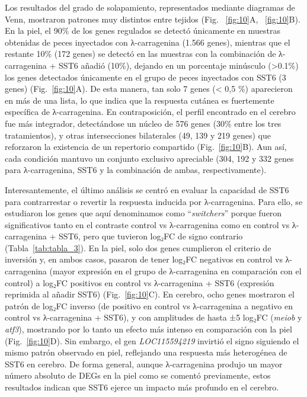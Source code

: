\documentclass[10pt,a4paper]{article}
\begin{document}
\newpage
Los resultados del grado de solapamiento, representados mediante diagramas de Venn, mostraron patrones muy distintos entre tejidos (Fig. ~\ref{fig:10}A, ~\ref{fig:10}B). En la piel, el 90\% de los genes regulados se detectó únicamente en muestras obtenidas de peces inyectados con λ-carragenina (1.566 genes), mientras que el restante 10\% (172 genes) se detectó en las muestras con la combinación de λ-carragenina + SST6 añadió (10\%), dejando en un porcentaje minúsculo (>0.1\%) los genes detectados únicamente en el grupo de peces inyectados con SST6 (3 genes) (Fig.~\ref{fig:10}A). De esta manera, tan solo 7 genes (< 0,5 \%) aparecieron en más de una lista, lo que indica que la respuesta cutánea es fuertemente específica de λ-carragenina. En contraposición, el perfil encontrado en el cerebro fue más integrador, detectándose un núcleo de 576 genes (30\% entre los tres tratamientos), y otras intersecciones bilaterales (49, 139 y 219 genes) que reforzaron la existencia de un repertorio compartido (Fig.~\ref{fig:10}B). Aun así, cada condición mantuvo un conjunto exclusivo apreciable (304, 192 y 332 genes para λ-carragenina, SST6 y la combinación de ambas, respectivamente).

Interesantemente, el último análisis se centró en evaluar la capacidad de SST6 para contrarrestar o revertir la respuesta inducida por λ-carragenina. Para ello, se estudiaron los genes que aquí denominamos como “\textit{switchers}” porque fueron significativos tanto en el contraste control vs λ-carragenina como en control vs λ-carragenina + SST6, pero que tuvieron log₂FC de signo contrario (Tabla~\ref{tab:tabla_3}). En la piel, solo dos genes cumplieron el criterio de inversión y, en ambos casos, pasaron de tener log₂FC negativos en control vs λ-carragenina (mayor expresión en el grupo de λ-carragenina en comparación con el control) a log₂FC positivos en control vs λ-carragenina + SST6 (expresión reprimida al añadir SST6) (Fig.~\ref{fig:10}C). En cerebro, ocho genes mostraron el patrón de log₂FC inverso (de positivo en control vs λ-carragenina a negativo en control vs λ-carragenina + SST6), y con amplitudes de hasta ±5 log₂FC (\textit{meiob} y \textit{atf3}), mostrando por lo tanto un efecto más intenso en comparación con la piel (Fig.~\ref{fig:10}D). Sin embargo, el gen \textit{LOC115594219} invirtió el signo siguiendo el mismo patrón observado en piel, reflejando una respuesta más heterogénea de SST6 en cerebro. De forma general, aunque λ-carragenina produjo un mayor número absoluto de DEGs en la piel como se comentó previamente, estos resultados indican que SST6 ejerce un impacto más profundo en el cerebro.
\end{document}
